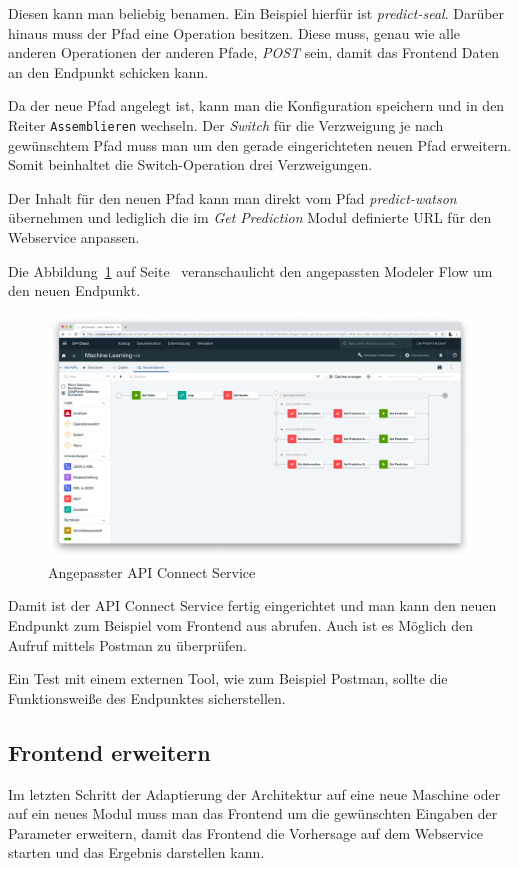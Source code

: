 Diesen kann man beliebig benamen. Ein Beispiel hierfür ist \textit{predict-seal}. Darüber hinaus muss der Pfad eine
Operation besitzen. Diese muss, genau wie alle anderen Operationen der anderen Pfade, \textit{POST} sein, damit das
Frontend Daten an den Endpunkt schicken kann.

Da der neue Pfad angelegt ist, kann man die Konfiguration speichern und in den Reiter \texttt{Assemblieren} wechseln.
Der \textit{Switch} für die Verzweigung je nach gewünschtem Pfad muss man um den gerade eingerichteten neuen Pfad
erweitern. Somit beinhaltet die Switch-Operation drei Verzweigungen.

Der Inhalt für den neuen Pfad kann man direkt vom Pfad \textit{predict-watson} übernehmen und lediglich die im
\textit{Get Prediction} Modul definierte URL für den Webservice anpassen.

Die Abbildung~\ref{fig:siegelmaschinen_apiconnect} auf Seite~\pageref{fig:siegelmaschinen_apiconnect} veranschaulicht
den angepassten Modeler Flow um den neuen Endpunkt.

\begin{figure}[h]
    \centering
    \includegraphics[width=\textwidth]{images/kapitel_5/vffs_apiconnect.png}
    \caption{Angepasster API Connect Service}
    \label{fig:siegelmaschinen_apiconnect}
\end{figure}

Damit ist der API Connect Service fertig eingerichtet und man kann den neuen Endpunkt zum Beispiel vom Frontend aus
abrufen. Auch ist es Möglich den Aufruf mittels Postman zu überprüfen.

Ein Test mit einem externen Tool, wie zum Beispiel Postman, sollte die Funktionsweiße des Endpunktes sicherstellen.

\subsection{Frontend erweitern}
Im letzten Schritt der Adaptierung der Architektur auf eine neue Maschine oder auf ein neues Modul muss man das Frontend
um die gewünschten Eingaben der Parameter erweitern, damit das Frontend die Vorhersage auf dem Webservice starten und
das Ergebnis darstellen kann.

